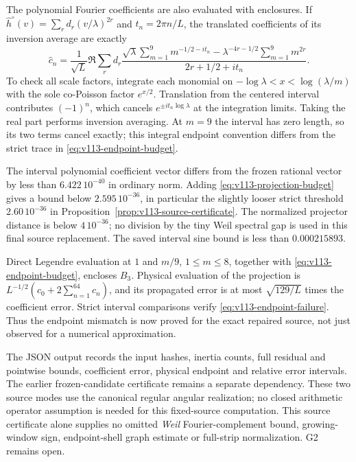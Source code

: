 \documentclass[11pt]{article}
\theoremstyle{remark}
\begin{document}
The polynomial Fourier coefficients are also evaluated with enclosures.
If $\widehat h^\circ(v)=\sum_r d_r(v/\lambda)^{2r}$ and
$t_n=2\pi n/L$, the translated coefficients of its inversion average
are exactly
\begin{equation}\label{eq:v113-mellin-polynomial}
 \widehat c_n=\frac1{\sqrt L}\Re\sum_r d_r
 \frac{\displaystyle\sqrt\lambda\sum_{m=1}^{9}m^{-1/2-it_n}
       -\displaystyle\lambda^{-4r-1/2}\sum_{m=1}^{9}m^{2r}}
      {2r+1/2+it_n}.
\end{equation}
To check all scale factors, integrate each monomial on
$-\log\lambda<x<\log(\lambda/m)$ with the sole co-Poisson factor
$e^{x/2}$. Translation from the centered interval contributes
$(-1)^n$, which cancels $e^{\pm it_n\log\lambda}$ at the integration
limits. Taking the real part performs inversion averaging. At $m=9$
the interval has zero length, so its two terms cancel exactly; this
integral endpoint convention differs from the strict trace in
\eqref{eq:v113-endpoint-budget}.

The interval polynomial coefficient vector differs from the frozen
rational vector by less than $6.422\,10^{-40}$ in ordinary norm.
Adding \eqref{eq:v113-projection-budget} gives a bound below
$2.595\,10^{-36}$, in particular the slightly looser strict threshold
$2.60\,10^{-36}$ in Proposition~\ref{prop:v113-source-certificate}.
The normalized projector distance is below $4\,10^{-36}$; no division
by the tiny Weil spectral gap is used in this final source replacement.
The saved interval sine bound is less than $0.000215893$.

Direct Legendre evaluation at $1$ and $m/9$, $1\le m\le8$, together
with \eqref{eq:v113-endpoint-budget}, encloses $B_3$.
Physical evaluation of the projection is
$L^{-1/2}(c_0+2\sum_{n=1}^{64}c_n)$, and its propagated error is
at most $\sqrt{129/L}$ times the coefficient error. Strict interval
comparisons verify \eqref{eq:v113-endpoint-failure}. Thus the endpoint
mismatch is now proved for the exact repaired source, not just observed
for a numerical approximation.

The JSON output records the input hashes, inertia counts, full residual
and pointwise bounds, coefficient error, physical endpoint and relative
error intervals. The earlier frozen-candidate certificate remains a
separate dependency. These two source modes use the canonical regular
angular realization; no closed arithmetic operator assumption is needed
for this fixed-source computation. This source certificate alone supplies
no omitted \emph{Weil} Fourier-complement bound, growing-window sign,
endpoint-shell graph estimate or full-strip normalization. G2 remains open.
\end{document}
